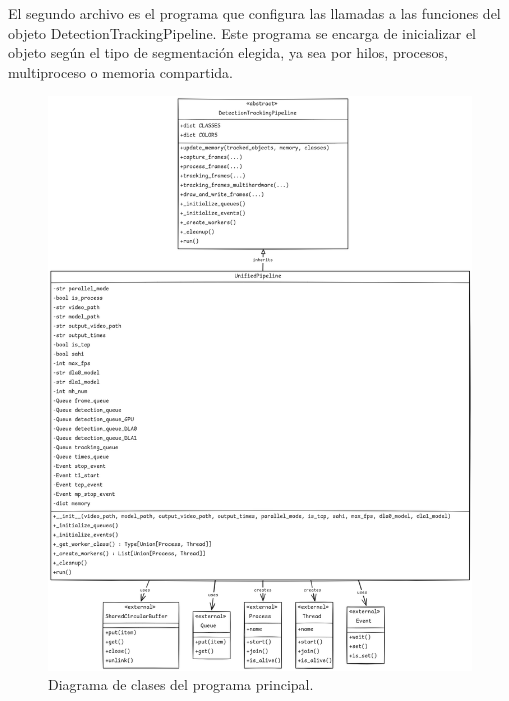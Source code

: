 \documentclass[11pt,spanish,listoffigures,listoftables]{tfgetsinf}
\begin{document}
   


   El segundo archivo es el programa que configura las llamadas a las funciones del objeto DetectionTrackingPipeline. Este programa se encarga de inicializar el objeto según el tipo de segmentación elegida, ya sea por hilos, procesos, multiproceso o memoria compartida. 


   \begin{figure}[H]
      \centering
      \includegraphics[width=1\textwidth]{codigo/images/unified_pipeline_uml.png}
      \caption[Diagrama de clases del programa principal]{Diagrama de clases del programa principal.}
      \label{fig:unified_pipeline_uml}
   \end{figure}
\end{document}
